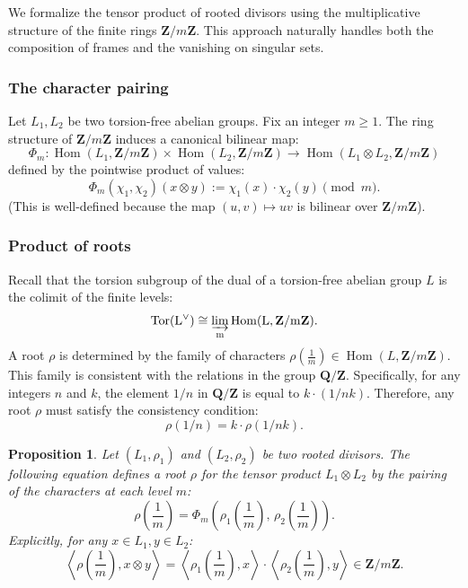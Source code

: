\documentclass[11pt,a4paper]{article}
\newcommand{\Q}{\mathbf{Q}}
\newcommand{\Z}{\mathbf{Z}}
\theoremstyle{plain}
\newtheorem{prop}[thm]{Proposition}
\theoremstyle{definition} %
\begin{document}
We formalize the tensor product of rooted divisors using the multiplicative structure of the finite rings $\Z/m\Z$. This approach naturally handles both the composition of frames and the vanishing on singular sets.

\subsubsection{The character pairing}

Let $L_1, L_2$ be two torsion-free abelian groups. Fix an integer $m \ge 1$.
The ring structure of $\Z/m\Z$ induces a canonical bilinear map:
\[
\Phi_m: \operatorname{Hom}(L_1, \Z/m\Z) \times \operatorname{Hom}(L_2, \Z/m\Z) \longrightarrow \operatorname{Hom}(L_1 \otimes L_2, \Z/m\Z)
\]
defined by the pointwise product of values:
\[
\Phi_m(\chi_1, \chi_2)(x \otimes y) := \chi_1(x) \cdot \chi_2(y) \pmod m.
\]
(This is well-defined because the map $(u,v) \mapsto uv$ is bilinear over $\Z/m\Z$).

\subsubsection{Product of roots}

Recall that the torsion subgroup of the dual of a torsion-free abelian group $L$  is the colimit of the finite levels:
\[
\rm{Tor}(L^\vee) \cong \varinjlim_m \operatorname{Hom}(L, \Z/m\Z).
\]
A root $\rho$ is determined by the family of characters $\rho(\frac{1}{m}) \in \operatorname{Hom}(L, \Z/m\Z)$. This family is consistent with the relations in the group $\Q/\Z$.
Specifically, for any integers $n$ and $k$, the element $1/n$ in $\Q/\Z$ is equal to $k \cdot (1/nk)$.
Therefore, any root $\rho$ must satisfy the consistency condition:
\begin{equation}\label{consist}
\rho(1/n) = k \cdot \rho(1/nk).
\end{equation}

\begin{prop}
Let $(L_1, \rho_1)$ and $(L_2, \rho_2)$ be two rooted divisors.
The following equation defines a  root $\rho$ for the tensor product $L_1 \otimes L_2$  by the pairing of the characters at each level $m$:
\begin{equation}\label{tensor}
\rho\left(\frac{1}{m}\right) = \Phi_m\left( \rho_1\left(\frac{1}{m}\right), \, \rho_2\left(\frac{1}{m}\right) \right).
\end{equation}
Explicitly, for any $x \in L_1, y \in L_2$:
\[
\left\langle \rho\left(\frac{1}{m}\right), x \otimes y \right\rangle = \left\langle \rho_1\left(\frac{1}{m}\right), x \right\rangle \cdot \left\langle \rho_2\left(\frac{1}{m}\right), y \right\rangle \in \Z/m\Z.
\]
\end{prop}
\end{document}

